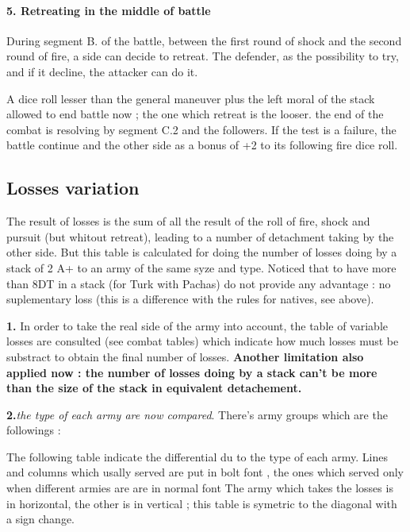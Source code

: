\paragraph{5. Retreating in the middle of battle\label{RetraiteEnBataille}}
During segment B. of the battle, between the first round of shock and the
second round of fire, a side can decide to retreat. The defender, as the  
possibility to try, and if it decline, the attacker can do it.

A dice roll lesser than the general maneuver plus the left moral of the   
stack allowed to end battle now ; the one which retreat is the looser. the
end of the combat is resolving by segment C.2 and the followers. If the  
test is a failure, the battle continue and the other side as a bonus of +2
to its following fire dice roll.

\subsection{Losses variation}
\label{PertesVariables}

The result of losses is the sum of all the result of the roll of fire,
shock and pursuit (but whitout retreat), leading to a number of detachment
taking by the other side. But this table is calculated for doing the
number of losses doing by a stack of 2 A+ to an army of the same syze and
type. Noticed that to have more than 8DT in a stack (for Turk with Pachas)
do not provide any advantage : no suplementary loss (this is a difference
with the rules for natives, see above).

{\bf 1.} In order to take the real side of the army into account, the table of
variable losses are consulted (see combat tables) which indicate how much 
losses must be substract to obtain the final number of losses. {\bf
Another limitation also applied now : the number of losses doing by a
stack can't be more than the size of the stack in equivalent detachement.}

{\bf 2.}{\it the type of each army are now compared}. There's army groups
which are the followings :

\classesnew

The following table indicate the differential du to the type of each army.
Lines and columns which usally served are put in bolt font , the ones which served
only when different armies are are in normal font 
The army which takes the losses is in horizontal, the other is in vertical ; 
this table is symetric to the diagonal with a sign change.

